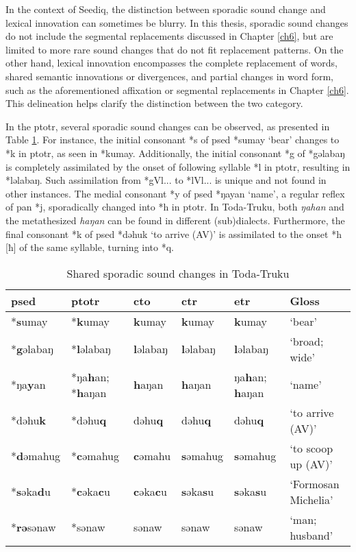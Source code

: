 In the context of Seediq, the distinction between sporadic sound change and lexical innovation can sometimes be blurry. In this thesis, sporadic sound changes do not include the segmental replacements discussed in Chapter \ref{ch6}, but are limited to more rare sound changes that do not fit replacement patterns. On the other hand, lexical innovation encompasses the complete replacement of words, shared semantic innovations or divergences, and partial changes in word form, such as the aforementioned affixation or segmental replacements in Chapter \ref{ch6}. This delineation helps clarify the distinction between the two category.

In the \acl{ptotr}, several sporadic sound changes can be observed, as presented in Table \ref{tab:totr_sp}. For instance, the initial consonant *s of \acl{psed} *sumay `bear' changes to *k in \acl{ptotr}, as seen in *kumay. Additionally, the initial consonant *g of *gəlabaŋ is completely assimilated by the onset of following syllable *l in \acl{ptotr}, resulting in *ləlabaŋ. Such assimilation from *gVl... to *lVl... is unique and not found in other instances. The medial consonant *y of \acl{psed} *ŋayan `name', a regular reflex of \acl{pan} *j, sporadically changed into *h in \acl{ptotr}. In Toda-Truku, both \textit{ŋahan} and the metathesized \textit{haŋan} can be found in different (sub)dialects. Furthermore, the final consonant *k of \acl{psed} *dəhuk `to arrive (AV)' is assimilated to the onset *h [ħ] of the same syllable, turning into *q.

\begin{table}[!htbp]
\centering
\caption{Shared sporadic sound changes in Toda-Truku}
\label{tab:totr_sp}
\begin{tabular}{llllll}
\hline
\ac{psed} & \ac{ptotr} & \ac{cto} & \ac{ctr} & \ac{etr} & Gloss               \\ \hline
*\textbf{s}umay    & *\textbf{k}umay     & \textbf{k}umay    & \textbf{k}umay    & \textbf{k}umay    & `bear'              \\
*\textbf{g}əlabaŋ  & *\textbf{l}əlabaŋ   & \textbf{l}əlabaŋ  & \textbf{l}əlabaŋ  & \textbf{l}əlabaŋ  & `broad; wide'       \\
*ŋa\textbf{y}an & *ŋa\textbf{h}an; *\textbf{h}aŋan   & \textbf{h}aŋan  & \textbf{h}aŋan  & ŋa\textbf{h}an; \textbf{h}aŋan  & `name'       \\
*dəhu\textbf{k}    & *dəhu\textbf{q}     & dəhu\textbf{q}    & dəhu\textbf{q}    & dəhu\textbf{q}    & `to arrive (AV)'    \\
*\textbf{d}əmahug  & *\textbf{c}əmahug   & \textbf{c}əmahu   & \textbf{s}əmahug  & \textbf{s}əmahug  & `to scoop up (AV)'  \\
*\textbf{s}əka\textbf{d}u   & *\textbf{c}əka\textbf{c}u    & \textbf{c}əka\textbf{c}u   & \textbf{s}əka\textbf{s}u   & \textbf{s}əka\textbf{s}u   & `Formosan Michelia' \\
*\textbf{rə}sənaw  & *sənaw     & sənaw    & sənaw    & sənaw    & `man; husband'     \\ \hline    
\end{tabular}
\end{table}


